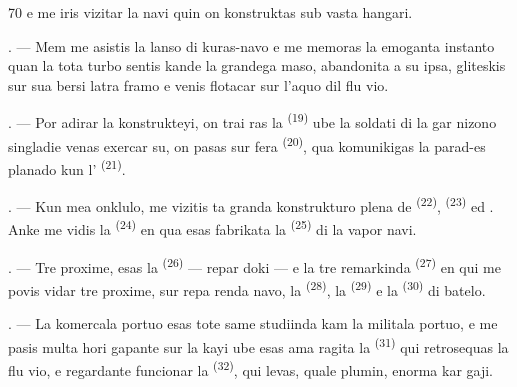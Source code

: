 \begin{VUpage}[72]{70}
\VUcontinue
e me iris vizitar la navi quin on konstruktas\nl
sub vasta hangari.

. --- Mem me asistis la lanso di kuras-navo\nl
e me memoras la emoganta instanto quan la\nl
tota turbo sentis kande la grandega maso,\nl
abandonita a su ipsa, gliteskis sur sua bersi\cc
latra framo e venis flotacar sur l'aquo dil flu\cc
vio.

. --- Por adirar la konstrukteyi, on trai\cc
ras la  \textsuperscript{(19)} ube la soldati di la gar\cc
nizono singladie venas exercar su, on pasas sur\nl
fera  \textsuperscript{(20)}, qua komunikigas la parad-es\cc
planado kun l' \textsuperscript{(21)}.

\VUsaut{3.0mm}
\VUsaut{3.0mm}

. --- Kun mea onklulo, me vizitis ta granda\nl
konstrukturo plena de  \textsuperscript{(22)},  \textsuperscript{(23)}\nl
ed . Anke me vidis la  \textsuperscript{(24)} en\nl
qua esas fabrikata la  \textsuperscript{(25)} di la vapor\cc
navi.

. --- Tre proxime, esas la  \textsuperscript{(26)} --- repar\cc
doki --- e la tre remarkinda  \textsuperscript{(27)}\nl
en qui me povis vidar tre proxime, sur repa\cc
renda navo, la  \textsuperscript{(28)}, la  \textsuperscript{(29)} e la \cc
{} \textsuperscript{(30)} di batelo.

. --- La komercala portuo esas tote same\nl
studiinda kam la militala portuo, e me pasis\nl
multa hori gapante sur la kayi ube esas ama\cc
ragita la  \textsuperscript{(31)} qui retrosequas la flu\cc
vio, e regardante funcionar la \cc
{} \textsuperscript{(32)}, qui levas, quale plumin, enorma kar\cc
gaji.
\end{VUpage}

